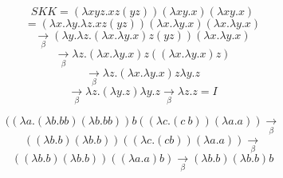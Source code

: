 ﻿\documentclass{report}
\begin{document}
    $$S K K = (\lambda x y z.x z (y z)) (\lambda x y.x) (\lambda x y.x) $$
    $$= (\lambda x.\lambda y.\lambda z.x z (y z))(\lambda x.\lambda y.x) (\lambda x.\lambda y.x)$$
    $$\xrightarrow[\beta]{} (\lambda y.\lambda z.(\lambda x.\lambda y.x) z (y z)) (\lambda x.\lambda y.x)$$
    $$\xrightarrow[\beta]{} \lambda z.(\lambda x.\lambda y.x) z ((\lambda x.\lambda y.x) z)$$
    $$\xrightarrow[\beta]{} \lambda z.(\lambda x.\lambda y.x) z \lambda y.z$$
    $$\xrightarrow[\beta]{} \lambda z.(\lambda y.z) \lambda y.z
    \xrightarrow[\beta]{} \lambda z.z = I$$

    $$ ((\lambda a.(\lambda b.b b) (\lambda b.b b)) b
    ((\lambda c.(c\:b)) (\lambda a.a))\xrightarrow[\beta]{}$$
    $$((\lambda b.b)(\lambda b.b))((\lambda c.(c b))(\lambda a.a))\xrightarrow[\beta]{}$$
    $$((\lambda b.b)(\lambda b.b))((\lambda a.a) b)\xrightarrow[\beta]{}(\lambda b.b)(\lambda b.b) b$$
\end{document}
